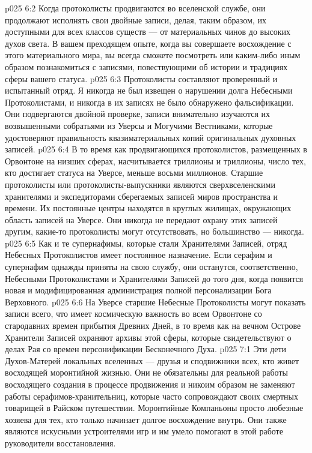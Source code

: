 \vs p025 6:2 Когда протоколисты продвигаются во вселенской службе, они продолжают исполнять свои двойные записи, делая, таким образом, их доступными для всех классов существ --- от материальных чинов до высоких духов света. В вашем преходящем опыте, когда вы совершаете восхождение с этого материального мира, вы всегда сможете посмотреть или каким\hyp{}либо иным образом познакомиться с записями, повествующими об истории и традициях сферы вашего статуса.
\vs p025 6:3 Протоколисты составляют проверенный и испытанный отряд. Я никогда не был извещен о нарушении долга Небесными Протоколистами, и никогда в их записях не было обнаружено фальсификации. Они подвергаются двойной проверке, записи внимательно изучаются их возвышенными собратьями из Уверсы и Могучими Вестниками, которые удостоверяют правильность квазиматериальных копий оригинальных духовных записей.
\vs p025 6:4 В то время как продвигающихся протоколистов, размещенных в Орвонтоне на низших сферах, насчитывается триллионы и триллионы, число тех, кто достигает статуса на Уверсе, меньше восьми миллионов. Старшие протоколисты или протоколисты\hyp{}выпускники являются сверхвселенскими хранителями и экспедиторами сберегаемых записей миров пространства и времени. Их постоянные центры находятся в круглых жилищах, окружающих область записей на Уверсе. Они никогда не передают охрану этих записей другим, какие\hyp{}то протоколисты могут отсутствовать, но большинство --- никогда.
\vs p025 6:5 Как и те супернафимы, которые стали Хранителями Записей, отряд Небесных Протоколистов имеет постоянное назначение. Если серафим и супернафим однажды приняты на свою службу, они останутся, соответственно, Небесными Протоколистами и Хранителями Записей до того дня, когда появится новая и модифицированная администрация полной персонализации Бога Верховного.
\vs p025 6:6 На Уверсе старшие Небесные Протоколисты могут показать записи всего, что имеет космическую важность во всем Орвонтоне со стародавних времен прибытия Древних Дней, в то время как на вечном Острове Хранители Записей охраняют архивы этой сферы, которые свидетельствуют о делах Рая со времен персонификации Бесконечного Духа.
\vs p025 7:1 Эти дети Духов\hyp{}Матерей локальных вселенных --- друзья и сподвижники всех, кто живет восходящей моронтийной жизнью. Они не обязательны для реальной работы восходящего создания в процессе продвижения и никоим образом не заменяют работы серафимов\hyp{}хранительниц, которые часто сопровождают своих смертных товарищей в Райском путешествии. Моронтийные Компаньоны просто любезные хозяева для тех, кто только начинает долгое восхождение внутрь. Они также являются искусными устроителями игр и им умело помогают в этой работе руководители восстановления.
